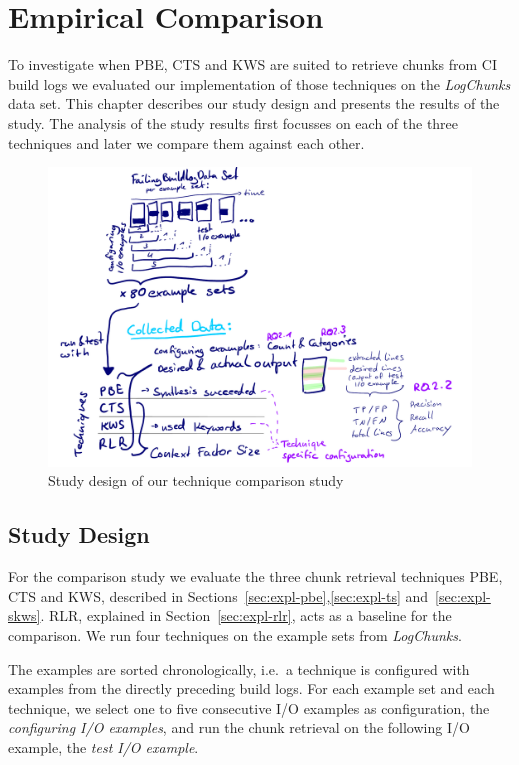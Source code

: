 \documentclass[\myrootdir/main.tex]{subfiles}
\begin{document}
\chapter{Empirical Comparison}
\label{sec:study}
To investigate when PBE, CTS and KWS are suited to retrieve chunks from CI build logs we evaluated our implementation of those techniques on the \emph{LogChunks} data set.
This chapter describes our study design and presents the results of the study.
The analysis of the study results first focusses on each of the three techniques and later we compare them against each other.


\begin{figure}[htbp]
	\centering
	\includegraphics[width=\textwidth, clip]{img/study-design.pdf}
	\caption{Study design of our technique comparison study}
	\label{fig:study}
\end{figure}

\section{Study Design}
For the comparison study we evaluate the three chunk retrieval techniques PBE, CTS and KWS, described in Sections~\ref{sec:expl-pbe},\ref{sec:expl-ts} and~\ref{sec:expl-skws}.
RLR, explained in Section~\ref{sec:expl-rlr}, acts as a baseline for the comparison.
We run four techniques on the example sets from \emph{LogChunks}.

The examples are sorted chronologically, i.e.\ a technique is configured with examples from the directly preceding build logs.
For each example set and each technique, we select one to five consecutive I/O examples as configuration, the \emph{configuring I/O examples}, and run the chunk retrieval on the following I/O example, the \emph{test I/O example}.
\end{document}
